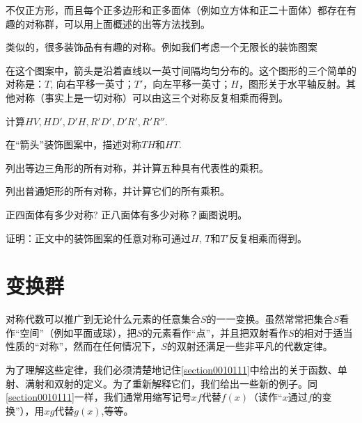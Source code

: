不仅正方形，而且每个正多边形和正多面体（例如立方体和正二十面体）都存在有趣的对称群，可以用上面概述的出等方法找到。

类似的，很多装饰品有有趣的对称。例如我们考虑一个无限长的装饰图案

\begin{figure}[h]
\begin{center}
\end{center}
\end{figure}

在这个图案中，箭头是沿着直线以一英寸间隔均匀分布的。这个图形的三个简单的对称是：$T$, 向右平移一英寸；$T'$，向左平移一英寸；$H$，图形关于水平轴反射。其他对称（事实上是一切对称）可以由这三个对称反复相乘而得到。

\begin{problemset}
\item 计算$HV, HD', D'H, R'D', D'R', R'R''$.

\item 在“箭头”装饰图案中，描述对称$TH$和$HT$.

\item 列出等边三角形的所有对称，并计算五种具有代表性的乘积。

\item 列出普通矩形的所有对称，并计算它们的所有乘积。

\item 正四面体有多少对称? 正八面体有多少对称？画图说明。

\item 证明：正文中的装饰图案的任意对称可通过$H$, $T$和$T'$反复相乘而得到。

\end{problemset}



\section{变换群}\label{section0010602}
对称代数可以推广到无论什么元素的任意集合$S$的一一变换。虽然常常把集合$S$看作“空间”（例如平面或球），把$S$的元素看作“点”，并且把双射看作$S$的相对于适当性质的“对称”，然而在任何情况下，$S$的双射还满足一些非平凡的代数定律。

为了理解这些定律，我们必须清楚地记住\ref{section0010111}中给出的关于函数、单射、满射和双射的定义。为了重新解释它们，我们给出一些新的例子。同\ref{section0010111}一样，我们通常用缩写记号$xf$代替$f(x)$（读作“$x$通过$f$的变换”），用$xg$代替$g(x)$,等等。

